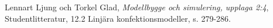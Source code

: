 \begin{thebibliography}{99}
Lennart Ljung och Torkel Glad, \textit{Modellbygge och simulering, upplaga 2:4}, Studentlitteratur, 12.2 Linjära konfektionsmodeller, s. 279-286.
\end{thebibliography}
